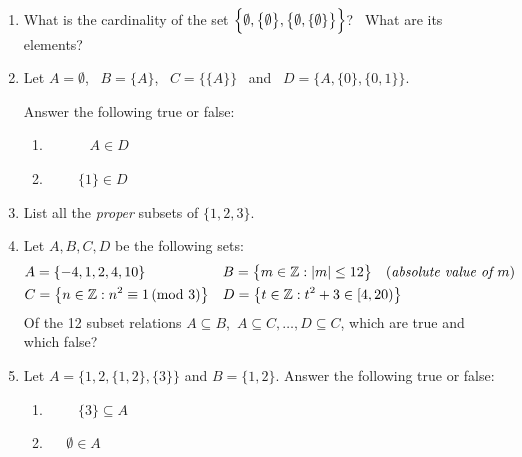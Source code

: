 \begin{exercises}{}{}
\begin{enumerate}
					
		\item What is the cardinality of the set $\Bigl\{\emptyset,\bigl\{\emptyset\bigr\},\bigl\{\emptyset,\{\emptyset\}\bigr\}\Bigr\}$? \ What are its elements?
		
		\item Let $A=\emptyset$, \ $B=\{A\}$, \ $C=\bigl\{\{A\}\bigr\}$ \ and \ $D=\bigl\{A,\{0\},\{0,1\}\bigr\}$.\par
	  Answer the following true or false:
	  \begin{enumerate}
	    \item {} \  \  \  \ $A\in D$
	    \setcounter{enumii}{5}
	    \item {} \  \  \ $\{1\}\in D$
	  \end{enumerate}
	  
	  
	  \item List all the \emph{proper} subsets of $\{1,2,3\}$.
	  
	    
		\goodbreak
	   
		   
		\item Let $A,B,C,D$ be the following sets:
	  \begin{align*}
	  	&A=\{-4,1,2,4,10\}
	  	&&B=\bigl\{m\in\mathbb{Z}:\left| m\right|\le 12\bigr\}\quad \text{(\emph{absolute value of $m$})}\\
	  	&C=\bigl\{n\in\mathbb{Z}:n^2\equiv 1\negthickspace\pmod{3}\bigr\}
	  	&&D=\bigl\{t\in\mathbb{Z}:t^2+3\in [4,20)\bigr\}  
	  \end{align*}
	  Of the 12 subset relations $A\subseteq B$,\ $A\subseteq C,\ldots, D\subseteq C$, which are true and which false?
	  
	  \item Let $A=\bigl\{1,2,\{1,2\},\{3\}\bigr\}$ and $B=\{1,2\}$. Answer the following true or false:
	  \begin{enumerate}
	    \item {} \  \  \ $\{3\}\subseteq A$
	    \setcounter{enumii}{4}
	    \item {} \  \ $\emptyset\in A$
	  \end{enumerate}
	  

\end{enumerate}
\end{exercises}

